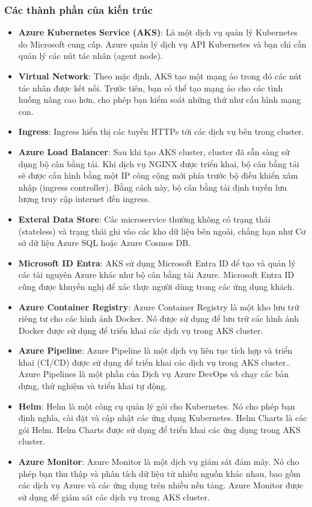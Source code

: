 \subsubsection{Các thành phần của kiến trúc}
\begin{itemize}
    \item \textbf{Azure Kubernetes Service (AKS)}: Là một dịch vụ quản lý Kubernetes do Microsoft cung cấp. Azure quản lý dịch vụ API Kubernetes và bạn chỉ cần quản lý các nút tác nhân (agent node).
    \item \textbf{Virtual Network}: Theo mặc định, AKS tạo một mạng ảo trong đó các nút tác nhân được kết nối. Trước tiên, bạn có thể tạo mạng ảo cho các tình huống nâng cao hơn, cho phép bạn kiểm soát những thứ như cấu hình mạng con.
    \item \textbf{Ingress}: Ingress hiển thị các tuyến HTTPs tới các dịch vụ bên trong cluster.
    \item \textbf{Azure Load Balancer}: Sau khi tạo AKS cluster, cluster đã sẵn sàng sử dụng bộ cân bằng tải. Khi dịch vụ NGINX được triển khai, bộ cân bằng tải sẽ được cấu hình bằng một IP công cộng mới phía trước bộ điều khiển xâm nhập (ingress controller). Bằng cách này, bộ cân bằng tải định tuyến lưu lượng truy cập internet đến ingress.
    \item \textbf{Exteral Data Store}: Các microservice thường không có trạng thái (stateless) và trạng thái ghi vào các kho dữ liệu bên ngoài, chẳng hạn như Cơ sở dữ liệu Azure SQL hoặc Azure Cosmos DB.
    \item \textbf{Microsoft ID Entra}: AKS sử dụng Microsoft Entra ID để tạo và quản lý các tài nguyên Azure khác như bộ cân bằng tải Azure. Microsoft Entra ID cũng được khuyến nghị để xác thực người dùng trong các ứng dụng khách.
    \item \textbf{Azure Container Registry}: Azure Container Registry là một kho lưu trữ riêng tư cho các hình ảnh Docker. Nó được sử dụng để lưu trữ các hình ảnh Docker được sử dụng để triển khai các dịch vụ trong AKS cluster.
    \item \textbf{Azure Pipeline}: Azure Pipeline là một dịch vụ liên tục tích hợp và triển khai (CI/CD) được sử dụng để triển khai các dịch vụ trong AKS cluster.. Azure Pipelines là một phần của Dịch vụ Azure DevOps và chạy các bản dựng, thử nghiệm và triển khai tự động.
    \item \textbf{Helm}: Helm là một công cụ quản lý gói cho Kubernetes. Nó cho phép bạn định nghĩa, cài đặt và cập nhật các ứng dụng Kubernetes. Helm Charts là các gói Helm. Helm Charts được sử dụng để triển khai các ứng dụng trong AKS cluster.
    \item \textbf{Azure Monitor}: Azure Monitor là một dịch vụ giám sát đám mây. Nó cho phép bạn thu thập và phân tích dữ liệu từ nhiều nguồn khác nhau, bao gồm các dịch vụ Azure và các ứng dụng trên nhiều nền tảng. Azure Monitor được sử dụng để giám sát các dịch vụ trong AKS cluster.
\end{itemize}
